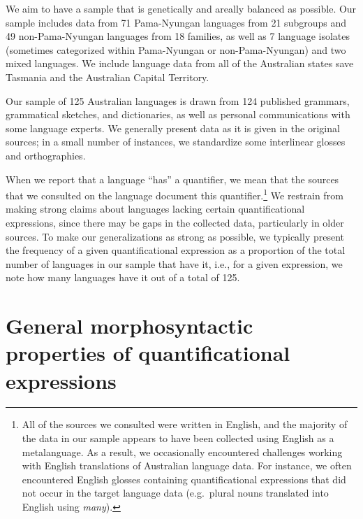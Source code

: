\documentclass[12pt,egregdoesnotlikesansseriftitles]{scrartcl}
\begin{document}
We aim to have a sample that is genetically and areally balanced as possible. Our sample includes data from 71 Pama-Nyungan languages from 21 subgroups and 49 non-Pama-Nyungan languages from 18 families, as well as 7 language isolates (sometimes categorized within Pama-Nyungan or non-Pama-Nyungan) and two mixed languages. We include language data from all of the Australian states save Tasmania and the Australian Capital Territory.

Our sample of 125 Australian languages  is drawn from 124 published grammars, grammatical sketches, and dictionaries, as well as personal communications with some language experts.  We generally present data as it is given in the original sources; in a small number of  instances, we standardize some interlinear glosses and orthographies.

When we report that a language ``has'' a quantifier, we mean that the sources that we consulted on the language document this quantifier.\footnote{All of the sources we consulted were written in English, and the majority of the data in our sample appears to have been collected using English as a metalanguage. As a result, we occasionally encountered challenges working with English translations of Australian language data. For instance, we often encountered English glosses containing quantificational expressions that did not occur in the target language data (e.g.\ plural nouns translated into English using \textit{many}).} We restrain from making strong claims about languages lacking certain quantificational
expressions, since there may be gaps in the collected data, particularly in older sources. To make our generalizations as strong as possible, we typically present the frequency of a given quantificational expression as a proportion of the total number of languages in our sample that have it, i.e., for a given expression, we note how many languages have it out of a total of 125.

\section{General morphosyntactic properties of  quantificational expressions}
\end{document}
